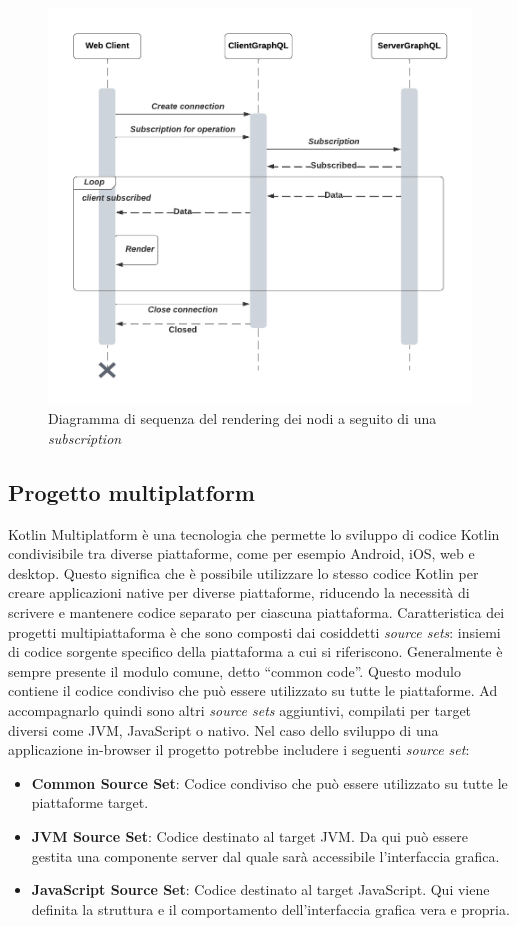 \begin{figure}
	\centering
	\includegraphics[width=.9\linewidth]{imgs/Rendering_Diagramma_Sequenza.pdf}
	\caption{Diagramma di sequenza del rendering dei nodi a seguito di una \textit{subscription}}
	\label{fig:rendering-graphics}
\end{figure}

\subsection{Progetto multiplatform}
Kotlin Multiplatform è una tecnologia che permette lo sviluppo di codice Kotlin condivisibile tra diverse piattaforme, come per esempio Android, iOS, web e desktop. Questo significa che è possibile utilizzare lo stesso codice Kotlin per creare applicazioni native per diverse piattaforme, riducendo la necessità di scrivere e mantenere codice separato per ciascuna piattaforma. 
Caratteristica dei progetti multipiattaforma è che sono composti dai cosiddetti \textit{source sets}: insiemi di codice sorgente specifico della piattaforma a cui si riferiscono. Generalmente è sempre presente il modulo comune, detto ``common code''. Questo modulo contiene il codice condiviso che può essere utilizzato su tutte le piattaforme. Ad accompagnarlo quindi sono altri \textit{source sets} aggiuntivi, compilati per target diversi come \ac{JVM}, JavaScript o nativo. Nel caso dello sviluppo di una applicazione in-browser il progetto potrebbe includere i seguenti \textit{source set}:
\begin{itemize}
	\item \textbf{Common Source Set}: Codice condiviso che può essere utilizzato su tutte le piattaforme target.
	\item \textbf{JVM Source Set}: Codice destinato al target \ac{JVM}. Da qui può essere gestita una componente server dal quale sarà accessibile l'interfaccia grafica.
	\item \textbf{JavaScript Source Set}: Codice destinato al target JavaScript. Qui viene definita la struttura e il comportamento dell'interfaccia grafica vera e propria.
\end{itemize}

